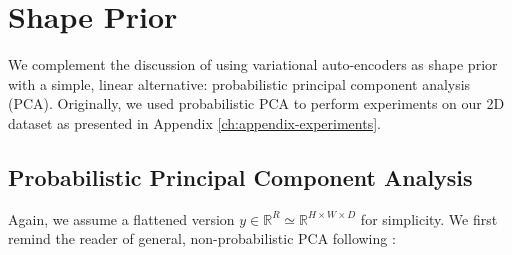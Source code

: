 \chapter{Shape Prior}
\label{ch:appendix-shape-prior}

We complement the discussion of using variational auto-encoders as shape
prior with a simple, linear alternative: probabilistic principal component analysis (PCA).
Originally, we used probabilistic PCA to perform experiments on our 2D dataset
as presented in Appendix \ref{ch:appendix-experiments}.

\section{Probabilistic Principal Component Analysis}
\label{sec:appendix-shape-prior-ppca}

Again, we assume a flattened version $y \in \mathbb{R}^R \simeq \mathbb{R}^{H \times W \times D}$
for simplicity. We first remind the reader of general, non-probabilistic PCA following \cite[Section~12.1]{Bishop:2006}:


